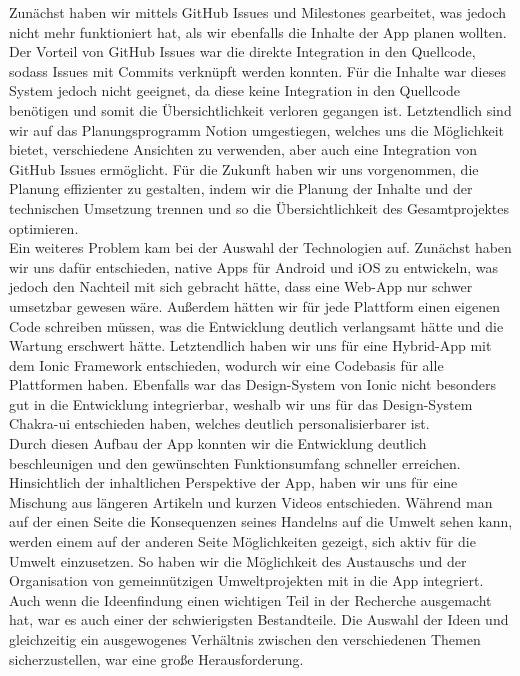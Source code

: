 \documentclass[../main.tex]{subfiles}
\begin{document}
    Zunächst haben wir mittels GitHub Issues und Milestones gearbeitet, was jedoch nicht mehr funktioniert hat, als wir ebenfalls die Inhalte der App planen wollten.
    Der Vorteil von GitHub Issues war die direkte Integration in den Quellcode, sodass Issues mit Commits verknüpft werden konnten.
    Für die Inhalte war dieses System jedoch nicht geeignet, da diese keine Integration in den Quellcode benötigen und somit die Übersichtlichkeit verloren gegangen ist.
    Letztendlich sind wir auf das Planungsprogramm Notion umgestiegen, welches uns die Möglichkeit bietet, verschiedene Ansichten zu verwenden, aber auch eine Integration von GitHub Issues ermöglicht.
    Für die Zukunft haben wir uns vorgenommen, die Planung effizienter zu gestalten, indem wir die Planung der Inhalte und der technischen Umsetzung trennen und so die Übersichtlichkeit des Gesamtprojektes optimieren.
    \\
    Ein weiteres Problem kam bei der Auswahl der Technologien auf.
    Zunächst haben wir uns dafür entschieden, native Apps für Android und iOS zu entwickeln, was jedoch den Nachteil mit sich gebracht hätte, dass eine Web-App nur schwer umsetzbar gewesen wäre.
    Außerdem hätten wir für jede Plattform einen eigenen Code schreiben müssen, was die Entwicklung deutlich verlangsamt hätte und die Wartung erschwert hätte.
    Letztendlich haben wir uns für eine Hybrid-App mit dem Ionic Framework entschieden, wodurch wir eine Codebasis für alle Plattformen haben.
    Ebenfalls war das Design-System von Ionic nicht besonders gut in die Entwicklung integrierbar, weshalb wir uns für das Design-System Chakra-ui entschieden haben, welches deutlich personalisierbarer ist.
    \\
    Durch diesen Aufbau der App konnten wir die Entwicklung deutlich beschleunigen und den gewünschten Funktionsumfang schneller erreichen.
    \\
    Hinsichtlich der inhaltlichen Perspektive der App, haben wir uns für eine Mischung aus längeren Artikeln und kurzen Videos entschieden.
    Während man auf der einen Seite die Konsequenzen seines Handelns auf die Umwelt sehen kann, werden einem auf der anderen Seite Möglichkeiten gezeigt, sich aktiv für die Umwelt einzusetzen.
    So haben wir die Möglichkeit des Austauschs und der Organisation von gemeinnützigen Umweltprojekten mit in die App integriert.
    Auch wenn die Ideenfindung einen wichtigen Teil in der Recherche ausgemacht hat, war es auch einer der schwierigsten Bestandteile.
    Die Auswahl der Ideen und gleichzeitig ein ausgewogenes Verhältnis zwischen den verschiedenen Themen sicherzustellen, war eine große Herausforderung.
\end{document}
